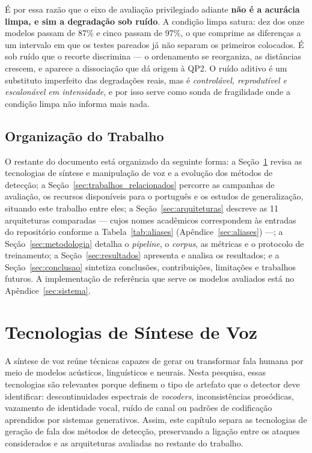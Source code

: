\documentclass[12pt,a4paper]{article}
\begin{document}
É por essa razão que o eixo de avaliação privilegiado adiante \textbf{não é a
	acurácia limpa, e sim a degradação sob ruído}. A condição limpa satura: dez dos
onze modelos passam de \num{87}\% e cinco passam de \num{97}\%, o que comprime
as diferenças a um intervalo em que os testes pareados já não separam os
primeiros colocados. É sob ruído que o recorte discrimina --- o ordenamento se
reorganiza, as distâncias crescem, e aparece a dissociação que dá origem à QP2.
O ruído aditivo é um substituto imperfeito das degradações reais, mas é
\emph{controlável, reprodutível e escalonável em intensidade}, e por isso serve
como sonda de fragilidade onde a condição limpa não informa mais nada.

\subsection{Organização do Trabalho}

O restante do documento está organizado da seguinte forma: a
Seção~\ref{sec:tecnologias_sintese} revisa as tecnologias de síntese e
manipulação de voz e a evolução dos métodos de detecção; a
Seção~\ref{sec:trabalhos_relacionados} percorre as campanhas de avaliação, os
recursos disponíveis para o português e os estudos de generalização, situando
este trabalho entre eles; a Seção~\ref{sec:arquiteturas}
descreve as \num{11} arquiteturas comparadas --- cujos nomes acadêmicos
correspondem às entradas do repositório conforme a
Tabela~\ref{tab:aliases} (Apêndice~\ref{sec:aliases}) ---; a
Seção~\ref{sec:metodologia} detalha o \textit{pipeline}, o \textit{corpus}, as
métricas e o protocolo de treinamento; a Seção~\ref{sec:resultados} apresenta e
analisa os resultados; e a Seção~\ref{sec:conclusao}
sintetiza conclusões, contribuições, limitações e trabalhos futuros. A
implementação de referência que serve os modelos avaliados está no
Apêndice~\ref{sec:sistema}.

\newpage

\section{Tecnologias de Síntese de Voz}
\label{sec:tecnologias_sintese}

A síntese de voz reúne técnicas capazes de gerar ou transformar fala humana por
meio de modelos acústicos, linguísticos e neurais. Nesta pesquisa, essas
tecnologias são relevantes porque definem o tipo de artefato que o detector deve
identificar: descontinuidades espectrais de \textit{vocoders}, inconsistências
prosódicas, vazamento de identidade vocal, ruído de canal ou padrões de
codificação aprendidos por sistemas generativos. Assim, este capítulo separa as
tecnologias de geração de fala dos métodos de detecção, preservando a ligação
entre os ataques considerados e as arquiteturas avaliadas no restante do
trabalho.
\end{document}
